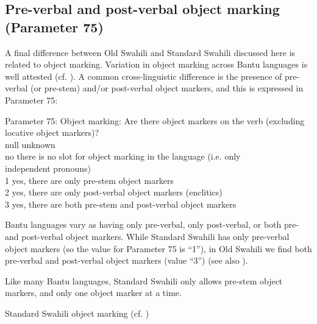 \documentclass[output=paper]{langscibook}
\begin{document}
\subsection{Pre-verbal and post-verbal object marking (Parameter 75)}\label{sec:marten:3.8} 

A final difference between Old Swahili and Standard Swahili discussed here is related to object marking. Variation in object marking across Bantu languages is well attested (cf. \citealt{Beaudoin-LietzEtAl2004, MartenKula2012, Marlo2015}). A common cross-linguistic difference is the presence of pre-verbal (or pre-stem) and/or post-verbal object markers, and this is expressed in Parameter 75:

\ea\label{ex:marten:43}
Parameter 75: Object marking: Are there object markers on the verb (excluding locative object markers)? \\
\gllllll null\hspace{1ex}    unknown\\
no  {there is no slot for object marking in the language (i.e. only}\\
{} {independent pronouns)}\\
1      {yes, there are only pre-stem object markers}\\
2       {yes, there are only post-verbal object markers (enclitics)}\\
3      {yes, there are both pre-stem and post-verbal object markers}\\
\z

Bantu languages vary as having only pre-verbal, only post-verbal, or both pre- and post-verbal object markers. While Standard Swahili has only pre-verbal object markers (so the value for Parameter 75 is ``1''), in Old Swahili we find both pre-verbal and post-verbal object markers (value ``3'') (see also \citealt{GibsonEtAl2019}). 

  Like many Bantu languages, Standard Swahili only allows pre-stem object markers, and only one object marker at a time. 

\ea\label{ex:marten:44}
Standard Swahili object marking (cf. \citealt[263/4]{MartenEtAl2007})

\end{document}
